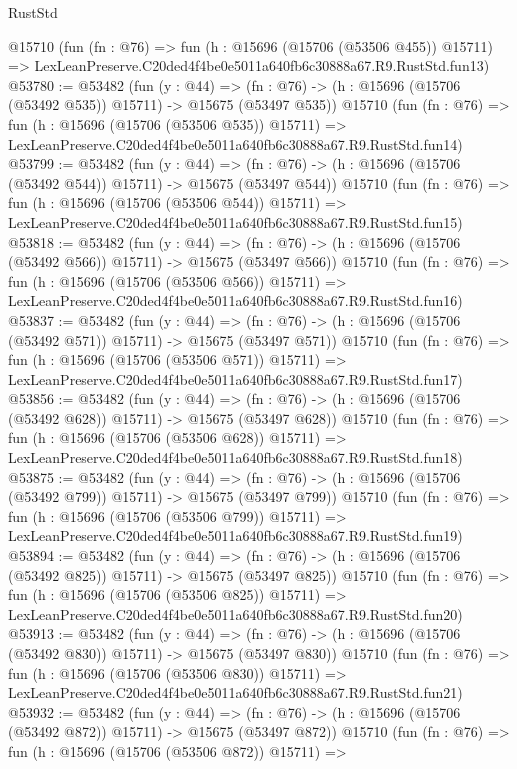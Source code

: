 \begin{lexlean}{RustStd}
\begin{coremodule}
    @15710
    (fun (fn : @76) =>
    fun (h : @15696 (@15706 (@53506 @455)) @15711) =>
    LexLeanPreserve.C20ded4f4be0e5011a640fb6c30888a67.R9.RustStd.fun13)
@53780 := @53482
    (fun (y : @44) =>
    (fn : @76) -> (h : @15696 (@15706 (@53492 @535)) @15711) -> @15675 (@53497 @535))
    @15710
    (fun (fn : @76) =>
    fun (h : @15696 (@15706 (@53506 @535)) @15711) =>
    LexLeanPreserve.C20ded4f4be0e5011a640fb6c30888a67.R9.RustStd.fun14)
@53799 := @53482
    (fun (y : @44) =>
    (fn : @76) -> (h : @15696 (@15706 (@53492 @544)) @15711) -> @15675 (@53497 @544))
    @15710
    (fun (fn : @76) =>
    fun (h : @15696 (@15706 (@53506 @544)) @15711) =>
    LexLeanPreserve.C20ded4f4be0e5011a640fb6c30888a67.R9.RustStd.fun15)
@53818 := @53482
    (fun (y : @44) =>
    (fn : @76) -> (h : @15696 (@15706 (@53492 @566)) @15711) -> @15675 (@53497 @566))
    @15710
    (fun (fn : @76) =>
    fun (h : @15696 (@15706 (@53506 @566)) @15711) =>
    LexLeanPreserve.C20ded4f4be0e5011a640fb6c30888a67.R9.RustStd.fun16)
@53837 := @53482
    (fun (y : @44) =>
    (fn : @76) -> (h : @15696 (@15706 (@53492 @571)) @15711) -> @15675 (@53497 @571))
    @15710
    (fun (fn : @76) =>
    fun (h : @15696 (@15706 (@53506 @571)) @15711) =>
    LexLeanPreserve.C20ded4f4be0e5011a640fb6c30888a67.R9.RustStd.fun17)
@53856 := @53482
    (fun (y : @44) =>
    (fn : @76) -> (h : @15696 (@15706 (@53492 @628)) @15711) -> @15675 (@53497 @628))
    @15710
    (fun (fn : @76) =>
    fun (h : @15696 (@15706 (@53506 @628)) @15711) =>
    LexLeanPreserve.C20ded4f4be0e5011a640fb6c30888a67.R9.RustStd.fun18)
@53875 := @53482
    (fun (y : @44) =>
    (fn : @76) -> (h : @15696 (@15706 (@53492 @799)) @15711) -> @15675 (@53497 @799))
    @15710
    (fun (fn : @76) =>
    fun (h : @15696 (@15706 (@53506 @799)) @15711) =>
    LexLeanPreserve.C20ded4f4be0e5011a640fb6c30888a67.R9.RustStd.fun19)
@53894 := @53482
    (fun (y : @44) =>
    (fn : @76) -> (h : @15696 (@15706 (@53492 @825)) @15711) -> @15675 (@53497 @825))
    @15710
    (fun (fn : @76) =>
    fun (h : @15696 (@15706 (@53506 @825)) @15711) =>
    LexLeanPreserve.C20ded4f4be0e5011a640fb6c30888a67.R9.RustStd.fun20)
@53913 := @53482
    (fun (y : @44) =>
    (fn : @76) -> (h : @15696 (@15706 (@53492 @830)) @15711) -> @15675 (@53497 @830))
    @15710
    (fun (fn : @76) =>
    fun (h : @15696 (@15706 (@53506 @830)) @15711) =>
    LexLeanPreserve.C20ded4f4be0e5011a640fb6c30888a67.R9.RustStd.fun21)
@53932 := @53482
    (fun (y : @44) =>
    (fn : @76) -> (h : @15696 (@15706 (@53492 @872)) @15711) -> @15675 (@53497 @872))
    @15710
    (fun (fn : @76) =>
    fun (h : @15696 (@15706 (@53506 @872)) @15711) =>

\end{coremodule}
\end{lexlean}

